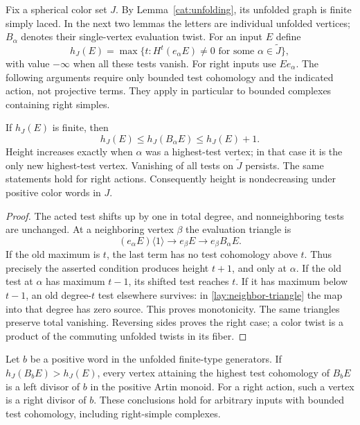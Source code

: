 Fix a spherical color set $J$.  By Lemma~\ref{cat:unfolding}, its
unfolded graph is finite simply laced.  In the next two lemmas the
letters are individual unfolded vertices; $B_\alpha$ denotes their
single-vertex evaluation twist.  For an input $E$ define
\begin{equation}
 h_J(E)=\max\{t:H^t(e_\alpha E)\ne0
                      \text{ for some }\alpha\in\widetilde J\},
 \label{lay:test-height}
\end{equation}
with value $-\infty$ when all these tests vanish.  For right inputs
use $Ee_\alpha$.  The following arguments require only bounded test
cohomology and the indicated action, not projective terms.  They apply
in particular to bounded complexes containing right simples.

\begin{lemma}\label{lay:height-change}
If $h_J(E)$ is finite, then
\[
 h_J(E)\le h_J(B_\alpha E)\le h_J(E)+1.
\]
Height increases exactly when $\alpha$ was a highest-test vertex;
in that case it is the only new highest-test vertex.  Vanishing of all
tests on $\widetilde J$ persists.  The same statements hold for right
actions.  Consequently height is nondecreasing under positive color
words in $J$.
\end{lemma}

\begin{proof}
The acted test shifts up by one in total degree, and nonneighboring
tests are unchanged.  At a neighboring vertex $\beta$ the evaluation
triangle is
\begin{equation}
 (e_\alpha E)\langle1\rangle\longrightarrow e_\beta E
       \longrightarrow e_\beta B_\alpha E.
 \label{lay:neighbor-triangle}
\end{equation}
If the old maximum is $t$, the last term has no test cohomology above
$t$.  Thus precisely the asserted condition produces height $t+1$,
and only at $\alpha$.  If the old test at $\alpha$ has maximum $t-1$,
its shifted test reaches $t$.  If it has maximum below $t-1$, an old
degree-$t$ test elsewhere survives: in
\eqref{lay:neighbor-triangle} the map into that degree has zero source.
This proves monotonicity.  The same triangles preserve total
vanishing.  Reversing sides proves the right case; a color twist is
a product of the commuting unfolded twists in its fiber.
\end{proof}

\begin{lemma}\label{lay:top-divisor}
Let $b$ be a positive word in the unfolded finite-type generators.
If $h_J(B_bE)>h_J(E)$, every vertex attaining the highest test
cohomology of $B_bE$ is a left divisor of $b$ in the positive Artin
monoid.  For a right action, such a vertex is a right divisor of $b$.
These conclusions hold for arbitrary inputs with bounded test
cohomology, including right-simple complexes.
\end{lemma}

